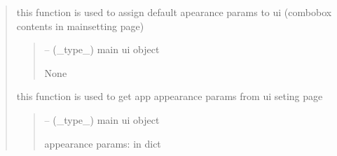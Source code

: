 \documentclass[letterpaper,10pt,english]{sphinxmanual}
\begin{document}
\begin{quote}
\begin{savenotes}\begin{fulllineitems}
\label{\detokenize{setting/backend/mainsetting_funcs:oxin.backend.mainsetting_funcs.assign_appearance_existing_params_to_ui}}
\pysigstartsignatures
{}
\pysigstopsignatures
\sphinxAtStartPar
this function is used to assign default apearance params to ui (combobox contents in main\sphinxhyphen{}setting page)
\begin{quote}\begin{description}
\sphinxAtStartPar
{} – (\_type\_) main ui object

\sphinxAtStartPar
None

\end{description}\end{quote}

\end{fulllineitems}\end{savenotes}


\begin{savenotes}\begin{fulllineitems}
\label{\detokenize{setting/backend/mainsetting_funcs:oxin.backend.mainsetting_funcs.get_appearance_params_from_ui}}
\pysigstartsignatures
{}
\pysigstopsignatures
\sphinxAtStartPar
this function is used to get app appearance params from ui seting page
\begin{quote}\begin{description}
\sphinxAtStartPar
{} – (\_type\_) main ui object

\sphinxAtStartPar
appearance params: in dict

\end{description}\end{quote}


\end{fulllineitems}
\end{savenotes}
\end{quote}
\end{document}

